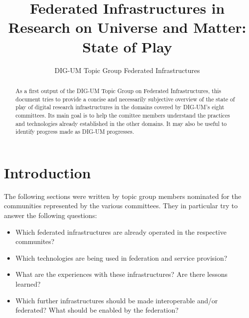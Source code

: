 \documentclass{article}
\title{Federated Infrastructures in Research on Universe and Matter:
State of Play}
\author{DIG-UM Topic Group Federated Infrastructures}
\begin{document}
\maketitle
\begin{abstract}
As a first output of the DIG-UM Topic Group on Federated Infrastructures,
this document tries to provide a concise and necessarily subjective
overview of the state of play of digital research infrastructures in
the domains covered by DIG-UM's eight committees.  Its main goal is to
help the comittee members understand the practices and technologies
already established in the other domains.  It may also be useful to
identify progress made as DIG-UM progresses.

\end{abstract}

\section{Introduction}

The following sections were written by topic group members nominated for
the communities represented by the various committees.  They in
particular try to answer the following questions:

\begin{itemize}
\item Which federated infrastructures are already operated in the
respective communites?
\item Which technologies are being used in federation and service
provision?
\item What are the experiences with these infrastructures?  Are there
lessons learned?
\item Which further infrastructures should be made interoperable and/or
federated?  What should be enabled by the federation?
\end{itemize}
















\end{document}
